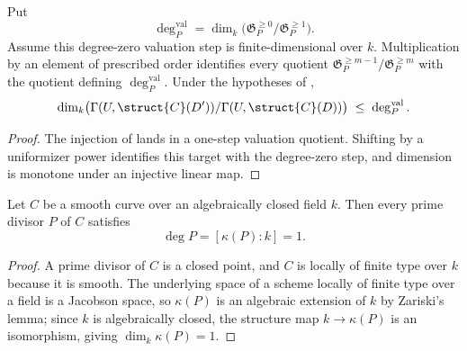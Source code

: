 \begin{theorem}
  \label{thm:adelic_local_step_dim_le_residue_degree}
  \leanok
  Put
  \[
    \deg_P^{\mathrm{val}}
      =\dim_k\bigl(\mathfrak G_P^{\ge0}/\mathfrak G_P^{\ge1}\bigr).
  \]
  Assume this degree-zero valuation step is finite-dimensional over \(k\).
  Multiplication by an element of prescribed order identifies every
  quotient \(\mathfrak G_P^{\ge m-1}/\mathfrak G_P^{\ge m}\) with the
  quotient defining \(\deg_P^{\mathrm{val}}\).  Under the hypotheses of
  ,
  \[
    \dim_k \bigl(\Gamma(U, \struct{C}(D'))/\Gamma(U, \struct{C}(D))\bigr)
      \;\le\; \deg_P^{\mathrm{val}}.
  \]
\end{theorem}
\begin{proof}
  \leanok
  The injection of  lands in a
  one-step valuation quotient.  Shifting by a uniformizer power identifies
  this target with the degree-zero step, and dimension is monotone under
  an injective linear map.
\end{proof}

\begin{theorem}
  \label{thm:adelic_residue_degree_one}
  \leanok
  Let \(C\) be a smooth curve over an algebraically closed field \(k\). Then
  every prime divisor \(P\) of \(C\) satisfies
  \[
    \deg P = [\kappa(P):k] = 1 .
  \]
\end{theorem}
\begin{proof}
  \leanok
  A prime divisor of \(C\) is a closed point, and \(C\) is locally of finite
  type over \(k\) because it is smooth. The underlying space of a scheme
  locally of finite type over a field is a Jacobson space, so
  \(\kappa(P)\) is an algebraic extension of \(k\) by Zariski's lemma; since
  \(k\) is algebraically closed, the structure map \(k \to \kappa(P)\) is an
  isomorphism, giving \(\dim_k \kappa(P) = 1\).
\end{proof}


